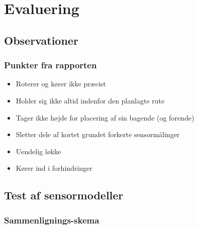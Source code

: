 \section{Evaluering}

\subsection{Observationer}

\begin{frame}
\frametitle{Punkter fra rapporten}
\begin{itemize}
\item Roterer og kører ikke præcist
\item Holder sig ikke altid indenfor den planlagte rute
\item Tager ikke højde for placering af sin bagende (og forende)
\item Sletter dele af kortet grundet forkerte sensormålinger
\item Uendelig løkke
\item Kører ind i forhindringer
\end{itemize}
\end{frame}

\subsection{Test af sensormodeller}
\begin{frame}
\frametitle{Sammenlignings-skema}
\begin{center}

\end{center}
\end{frame}